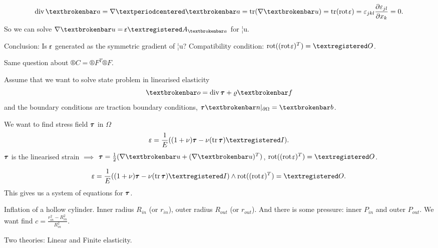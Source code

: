 \documentclass[12pt]{article}					%
\begin{document}
\begin{poznamka}[When $\bepsilon = \frac{1}{2}\(\nabla ¦u + (\nabla ¦u)^T\)$?]
	$$ \Div ¦a = \nabla · ¦a = \tr(\nabla ¦u) = \tr (\rot \bepsilon) = \epsilon_{jkl} \frac{\partial \epsilon_{jl}}{\partial x_k} = 0. $$
	So we can solve $\nabla ¦u = \bepsilon ®A_{¦a}$ for ¦u.

	Conclusion: Is $\hbox{$\shortmid\hspace{-0.6em}\varepsilon$}$ generated as the symmetric gradient of ¦u? Compatibility condition: $\rot((\rot \bepsilon)^T) = ®O$.
\end{poznamka}

\begin{poznamka}
	Same question about $®C = ®F^T®F$.
\end{poznamka}

\begin{poznamka}
	Assume that we want to solve state problem in linearised elasticity
	$$ ¦o = \Div \btau + \rho ¦f $$
	and the boundary conditions are traction boundary conditions, $\btau ¦n |_{\partial \Omega} = ¦b$.

	We want to find stress field $\tau\hspace{-0.48em}\tau$ in $\Omega$
	$$ \bepsilon = \frac{1}{E} ((1 + \nu) \btau - \nu(\tr \btau)®I). $$
	$\tau\hspace{-0.48em}\tau$ is the linearised strain $\implies$ $\btau = \frac{1}{2}(\nabla ¦u + (\nabla ¦u)^T)$, $\rot((\rot \bepsilon)^T) = ®O$.

	$$ \bepsilon = \frac{1}{E}((1 + \nu)\btau - \nu(\tr \btau)®I) \land \rot((\rot \bepsilon)^T) = ®O. $$
	This gives us a system of equations for $\tau\hspace{-0.48em}\tau$.
\end{poznamka}

\begin{priklad}
	Inflation of a hollow cylinder. Inner radius $R_{in}$ (or $r_{in}$), outer radius $R_{out}$ (or $r_{out}$). And there is some pressure: inner $P_{in}$ and outer $P_{out}$. We want find $c = \frac{r_{in}^2 - R_{in}^2}{R_{in}^2}$.

	Two theories: Linear and Finite elasticity.
\end{priklad}
\end{document}
